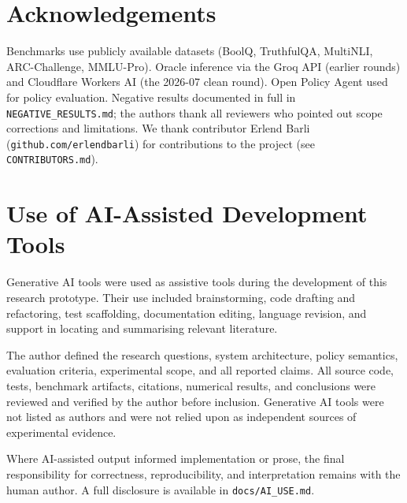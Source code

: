 \documentclass[10pt,twocolumn]{article}
\begin{document}
\section*{Acknowledgements}
Benchmarks use publicly available datasets (BoolQ, TruthfulQA, MultiNLI,
ARC-Challenge, MMLU-Pro). Oracle inference via the Groq API (earlier
rounds) and Cloudflare Workers AI (the 2026-07 clean round). Open Policy
Agent used for policy evaluation. Negative results documented in full in
\texttt{NEGATIVE\_RESULTS.md}; the authors thank all reviewers who pointed
out scope corrections and limitations. We thank contributor Erlend Barli
(\texttt{github.com/erlendbarli}) for contributions to the project
(see \texttt{CONTRIBUTORS.md}).

\section*{Use of AI-Assisted Development Tools}
Generative AI tools were used as assistive tools during the development of
this research prototype. Their use included brainstorming, code drafting
and refactoring, test scaffolding, documentation editing, language
revision, and support in locating and summarising relevant literature.

The author defined the research questions, system architecture, policy
semantics, evaluation criteria, experimental scope, and all reported
claims. All source code, tests, benchmark artifacts, citations, numerical
results, and conclusions were reviewed and verified by the author before
inclusion. Generative AI tools were not listed as authors and were not
relied upon as independent sources of experimental evidence.

Where AI-assisted output informed implementation or prose, the final
responsibility for correctness, reproducibility, and interpretation remains
with the human author. A full disclosure is available in
\texttt{docs/AI\_USE.md}.
\end{document}
